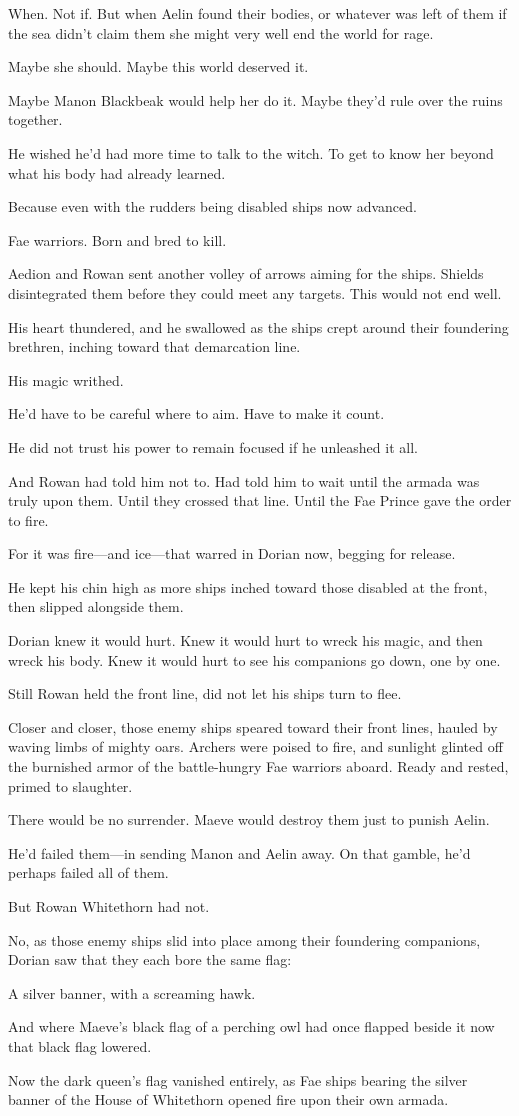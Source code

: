 When. Not if. But when Aelin found their bodies, or whatever was left of them if the sea didn't claim them  she might very well end the world for rage.

Maybe she should. Maybe this world deserved it.

Maybe Manon Blackbeak would help her do it. Maybe they'd rule over the ruins together.

He wished he'd had more time to talk to the witch. To get to know her beyond what his body had already learned.

Because even with the rudders being disabled  ships now advanced.

Fae warriors. Born and bred to kill.

Aedion and Rowan sent another volley of arrows aiming for the ships. Shields disintegrated them before they could meet any targets. This would not end well.

His heart thundered, and he swallowed as the ships crept around their foundering brethren, inching toward that demarcation line.

His magic writhed.

He'd have to be careful where to aim. Have to make it count.

He did not trust his power to remain focused if he unleashed it all.

And Rowan had told him not to. Had told him to wait until the armada was truly upon them. Until they crossed that line. Until the Fae Prince gave the order to fire.

For it was fire---and ice---that warred in Dorian now, begging for release.

He kept his chin high as more ships inched toward those disabled at the front, then slipped alongside them.

Dorian knew it would hurt. Knew it would hurt to wreck his magic, and then wreck his body. Knew it would hurt to see his companions go down, one by one.

Still Rowan held the front line, did not let his ships turn to flee.

Closer and closer, those enemy ships speared toward their front lines, hauled by waving limbs of mighty oars. Archers were poised to fire, and sunlight glinted off the burnished armor of the battle-hungry Fae warriors aboard. Ready and rested, primed to slaughter.

There would be no surrender. Maeve would destroy them just to punish Aelin.

He'd failed them---in sending Manon and Aelin away. On that gamble, he'd perhaps failed all of them.

But Rowan Whitethorn had not.

No, as those enemy ships slid into place among their foundering companions, Dorian saw that they each bore the same flag:

A silver banner, with a screaming hawk.

And where Maeve's black flag of a perching owl had once flapped beside it  now that black flag lowered.

Now the dark queen's flag vanished entirely, as Fae ships bearing the silver banner of the House of Whitethorn opened fire upon their own armada.
